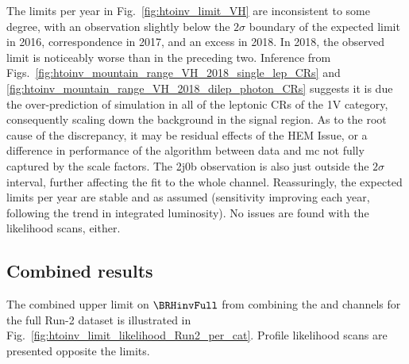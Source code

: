 The limits per year in Fig.~\ref{fig:htoinv_limit_VH} are inconsistent to some degree, with an observation slightly below the $\text{2}\sigma$ boundary of the expected limit in 2016, correspondence in 2017, and an excess in 2018. In 2018, the observed limit is noticeably worse than in the preceding two. Inference from Figs.~\ref{fig:htoinv_mountain_range_VH_2018_single_lep_CRs} and \ref{fig:htoinv_mountain_range_VH_2018_dilep_photon_CRs} suggests it is due the over-prediction of simulation in all of the leptonic \glspl{CR} of the 1V category, consequently scaling down the background in the signal region. As to the root cause of the discrepancy, it may be residual effects of the HEM Issue, or a difference in performance of the \deepakeight algorithm between data and \acrshort{mc} not fully captured by the scale factors. The 2j0b observation is also just outside the $\text{2}\sigma$ interval, further affecting the fit to the whole channel. Reassuringly, the expected limits per year are stable and as assumed (sensitivity improving each year, following the trend in integrated luminosity). No issues are found with the likelihood scans, either.




\subsection{Combined results}
\label{subsec:htoinv_combined_results}

The combined upper limit on $\BRHinvFull$ from combining the \ttH and \VH channels for the full Run-2 dataset is illustrated in Fig.~\ref{fig:htoinv_limit_likelihood_Run2_per_cat}. Profile likelihood scans are presented opposite the limits.

